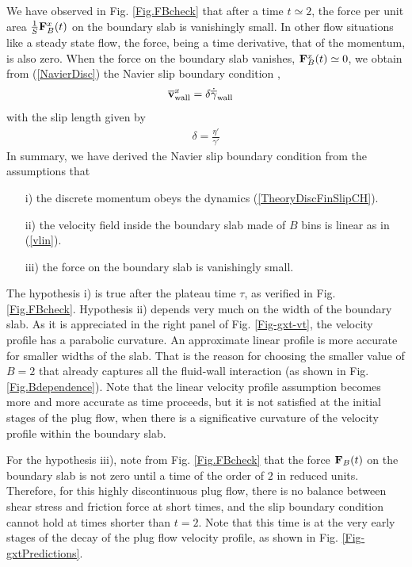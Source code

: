 \documentclass[b5paper,openright,10pt]{book}
\begin{document}
We have observed in Fig.  \ref{Fig.FBcheck} that after a time $t\simeq
2$,  the  force  per  unit area  $\frac{1}{S}{\bf  F}^x_B(t)$  on  the
boundary slab is  vanishingly small.  In other flow  situations like a
steady state  flow, the force,  being a  time derivative, that  of the
momentum, is also zero.  When the force on the boundary slab vanishes,
$ {\bf F}^x_B(t)\simeq 0$, we obtain from (\ref{NavierDisc}) the Navier
slip boundary condition \cite{Navier1827},
\begin{align}
\overline{\bf v}^x_{\rm wall}&=\delta\dot{\overline{\gamma}}_{\rm wall}
\label{NavierDisc2}
\end{align}
with the slip length given by
\begin{align}
  \delta =\frac{\eta'}{\gamma'}
\label{SlipLength}
\end{align}
In summary,  we have derived  the Navier slip boundary  condition from
the  assumptions  that 
\begin{enumerate}
\item[i)]   the  discrete  momentum obeys  the  dynamics (\ref{TheoryDiscFinSlipCH}).
\item[ii)] the velocity  field inside the boundary slab made of $B$ bins  is linear as in (\ref{vlin}).
\item[iii)] the force on the boundary slab is vanishingly small.

\end{enumerate}
The hypothesis i)  is true after the plateau time  $\tau$, as verified
in Fig.  \ref{Fig.FBcheck}.   Hypothesis ii) depends very  much on the
width  of   the  boundary  slab.    As  it  is  appreciated   in  the right panel of Fig.
\ref{Fig-gxt-vt}, the  velocity profile  has a parabolic  curvature. An
approximate linear profile is more  accurate for smaller widths of the
slab. That is the reason for  choosing the smaller value of $B=2$ that
already  captures   all  the  fluid-wall  interaction   (as  shown  in
Fig.  \ref{Fig.Bdependence}). Note  that the  linear velocity  profile
assumption becomes more and more accurate  as time proceeds, but it is
not satisfied at the initial stages of  the plug flow, when there is a
significative curvature  of the  velocity profile within  the boundary
slab. 

For the  hypothesis iii), note  from Fig.  \ref{Fig.FBcheck}  that the
force ${\bf F}_B(t)$ on the boundary slab  is not zero until a time of
the  order  of $2$  in  reduced  units.   Therefore, for  this  highly
discontinuous plug flow, there is  no balance between shear stress and
friction force at short times,  and the slip boundary condition cannot
hold at  times shorter than  $t=2$. Note that this  time is at  the very
early stages of the decay of  the plug flow velocity profile, as shown
in Fig. \ref{Fig-gxtPredictions}. 
\end{document}

